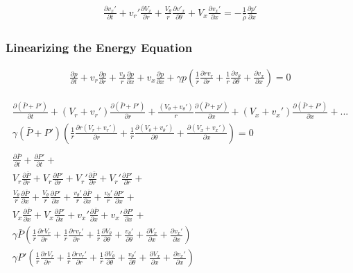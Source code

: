 \documentclass[12pt]{article}
\begin{document}
\begin{align*}
\boxed{
	\frac{\partial  v_x' }{\partial t} +
	v_r' \frac{\partial  V_x  }{\partial r} +
	\frac{V_{\theta}}{r} \frac{\partial v'_x}{\partial \theta} +
	V_x \frac{\partial v_x'}{\partial x} 
	= -\frac{1    }{\bar{\rho}}  \frac{\partial p'}{\partial x} 
}
\end{align*}



\subsubsection{Linearizing the Energy Equation}
\begin{align*}
\frac{\partial p}{\partial t} + v_r \frac{\partial p}{\partial r} + \frac{v_{\theta}}{r}\frac{\partial p}{\partial x} + v_x \frac{\partial p}{\partial x} 
+ \gamma p \left(\frac{1}{r} \frac{\partial r v_r}{\partial r} + \frac{1}{r} \frac{\partial v_{\theta}}{\partial \theta} + \frac{\partial v_x}{\partial x}\right) = 0
\end{align*}

\begin{align*}
\frac{\partial (\bar{P}+P')}{\partial t} + 
(V_r + v_r')
\frac{ \partial (\bar{P}+P')}{\partial r} + 
\frac{  (V_{\theta} + v_{\theta}') }{r}\frac{\partial (\bar{ P} +p') }{\partial x} + 
(V_x + v_x') 
\frac{\partial  (\bar{P}+P')}{\partial x} + ...\\
\gamma (\bar{P}+P') 
\left(
\frac{1}{r} \frac{\partial r (V_r + v_r')}{\partial r} + 
\frac{1}{r} \frac{\partial   (V_{\theta} + v_{\theta}')}{\partial \theta} + 
\frac{\partial (V_x + v_x')}{\partial x}
\right) = 0  	\\
\\
\frac{\partial \bar{P} }{\partial t} +
\frac{\partial      P' }{\partial t} +\\
V_r  \frac{\partial \bar{P}}{\partial r} + 
V_r  \frac{\partial    P'}{\partial r} + 
V_r' \frac{\partial \bar{P}}{\partial r} + 
V_r' \frac{\partial      P'}{\partial r} + \\     
\frac{V_{\theta}}{r} \frac{\partial \bar{ P}}{\partial x} + 
\frac{V_{\theta}}{r} \frac{\partial       P'}{\partial x} +
\frac{v_{\theta}'}{r} \frac{\partial \bar{ P}}{\partial x} + 
\frac{v_{\theta}'}{r} \frac{\partial       P'}{\partial x} + \\
V_x  \frac{\partial \bar{P}}{\partial x} + 
V_x  \frac{\partial    P'}{\partial x} + 
v_x' \frac{\partial \bar{P}}{\partial x} + 
v_x' \frac{\partial      P'}{\partial x} + \\ 
\gamma \bar{ P}  \left(\frac{1}{r} \frac{\partial r V_r}{\partial r} + \frac{1}{r} \frac{\partial r v_r'}{\partial r} + \frac{1}{r} \frac{\partial V_{\theta}}{\partial \theta} + \frac{v_{\theta}'}{\partial \theta}+ \frac{\partial V_x}{\partial x} + \frac{\partial v_x'}{\partial x}\right) \\
\gamma P' \left(\frac{1}{r} \frac{\partial r V_r}{\partial r} + \frac{1}{r} \frac{\partial r v_r'}{\partial r} + \frac{1}{r} \frac{\partial V_{\theta}}{\partial \theta} + \frac{v_{\theta}'}{\partial \theta}+ \frac{\partial V_x}{\partial x} + \frac{\partial v_x'}{\partial x}\right) 
\end{align*}
\end{document}
